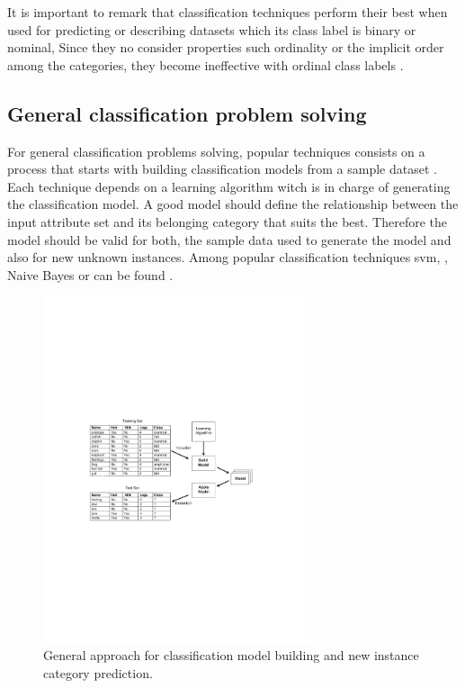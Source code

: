 It is important to remark that classification techniques perform their best when used for predicting or describing datasets which its class label is binary or nominal, Since they no consider properties such ordinality or the implicit order among the categories, they become ineffective with ordinal class labels \cite{frank2001simple}.

\subsection{General classification problem solving}
\label{general_classificartion_problem_solving}

For general classification problems solving, popular techniques consists on a process that starts with building classification models from a sample dataset \cite{witten2005data}. Each technique depends on a learning algorithm witch is in charge of generating the classification model. A good model should define the relationship between the input attribute set and its belonging category that suits the best. Therefore the model should be valid for both, the sample data used to generate the model and also for new unknown instances. Among popular classification techniques \acrfull{svm}, , Naive Bayes or  can be found \cite{garje2016sentiment}.

\begin{figure}[!htp]
  \center
  \includegraphics[width=0.7\textwidth]{figures/classification_problem_solving}
  \caption{General approach for classification model building and new instance category prediction.}
  \label{fig:classification_problem}
\end{figure}

